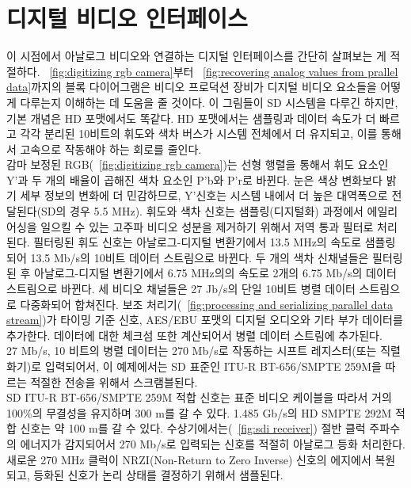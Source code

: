 \chapter{디지털 비디오 인터페이스}
이 시점에서 아날로그 비디오와 연결하는 디지털 인터페이스를 간단히 살펴보는 게 적절하다.
\figurename~\ref{fig:digitizing rgb camera}부터 \figurename~\ref{fig:recovering analog values from prallel data}까지의 블록 다이어그램은 비디오 프로덕션 장비가 디지털 비디오 요소들을 어떻게 다루는지 이해하는 데 도움을 줄 것이다.
이 그림들이 SD 시스템을 다루긴 하지만, 기본 개념은 HD 포맷에서도 똑같다. HD 포맷에서는 샘플링과 데이터 속도가 더 빠르고 각각 분리된 10비트의 휘도와 색차 버스가 시스템 전체에서 더 유지되고, 이를 통해서 고속으로 작동해야 하는 회로를 줄인다.
\\
감마 보정된 RGB(\figurename~\ref{fig:digitizing rgb camera})는 선형 행렬을 통해서 휘도 요소인 Y'과 두 개의 배율이 곱해진 색차 요소인 P'b와 P'r로 바뀐다.
눈은 색상 변화보다 밝기 세부 정보의 변화에 더 민감하므로, Y'신호는 시스템 내에서 더 높은 대역폭으로 전달된다(SD의 경우 5.5 MHz).
휘도와 색차 신호는 샘플링(디지털화) 과정에서 에일리어싱을 일으킬 수 있는 고주파 비디오 성분을 제거하기 위해서 저역 통과 필터로 처리된다.
필터링된 휘도 신호는 아날로그-디지털 변환기에서 13.5 MHz의 속도로 샘플링되어 13.5 Mb/s의 10비트 데이터 스트림으로 바뀐다.
두 개의 색차 신채널들은 필터링된 후 아날로그-디지털 변환기에서 6.75 MHz의의 속도로 2개의 6.75 Mb/s의 데이터 스트림으로 바뀐다.
세 비디오 채널들은 27 Jb/s의 단일 10비트 병렬 데이터 스트림으로 다중화되어 합쳐진다.
보조 처리기(\figurename~\ref{fig:processing and serializing parallel data stream})가 타이밍 기준 신호, AES/EBU 포맷의 디지털 오디오와 기타 부가 데이터를 추가한다. 데이터에 대한 체크섬 또한 계산되어서 병렬 데이터 스트림에 추가된다.
\\
27 Mb/s, 10 비트의 병렬 데이터는 270 Mb/s로 작동하는 시프트 레지스터(또는 직렬화기)로 입력되어서, 이 예제에서는 SD 표준인 ITU-R BT-656/SMPTE 259M을 따르는 적절한 전송을 위해서 스크램블된다.
\\
SD ITU-R BT-656/SMPTE 259M 적합 신호는 표준 비디오 케이블을 따라서 거의 100\%의 무결성을 유지하며 300 m를 갈 수 있다. 1.485 Gb/s의 HD SMPTE 292M 적합 신호는 약 100 m를 갈 수 있다.
수상기에서는(\figurename~\ref{fig:sdi receiver}) 절반 클럭 주파수의 에너지가 감지되어서 270 Mb/s로 입력되는 신호를 적절히 아날로그 등화 처리한다. 새로운 270 MHz 클럭이 NRZI(Non-Return to Zero Inverse) 신호의 에지에서 복원되고, 등화된 신호가 논리 상태를 결정하기 위해서 샘플된다.
